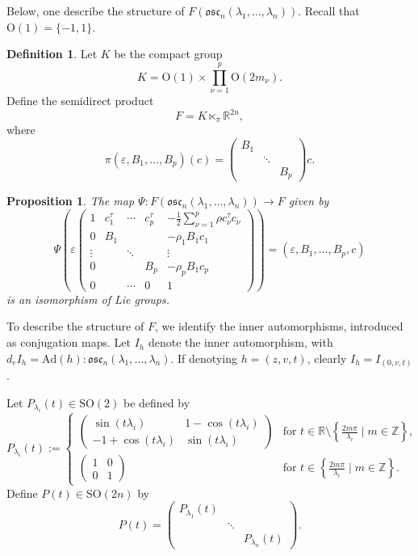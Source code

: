 \documentclass[12pt]{amsart}
\theoremstyle{plain}
\newtheorem{prop}[thm]{Proposition}
\theoremstyle{definition}
\newtheorem{defn}[thm]{Definition}
\theoremstyle{remark}
\begin{document}
Below, one describe the structure of \( F(\mathfrak{osc}_n(\lambda_1, \ldots, \lambda_n)) \). Recall that \( \mathrm{O}(1) = \{-1, 1\} \).
 

\begin{defn}
    Let \( K \) be the compact group
    \[
    K = \mathrm{O}(1) \times \prod_{\nu=1}^p \mathrm{O}(2m_{\nu}).
    \]
    Define the semidirect product
    \[
    F = K \ltimes_{\pi} \mathbb{R}^{2n},
    \]
    where
    \[
    \pi(\varepsilon, B_1, \ldots, B_p)(c) = \left( \begin{matrix}
    B_1  & & \\
     & \ddots & \\
      & & B_p
    \end{matrix} \right) c.
    \]	
\end{defn}

\begin{prop}
    The map \( \Psi: F(\mathfrak{osc}_n(\lambda_1, \ldots, \lambda_n)) \to F \) given by
    \[
    \Psi \left( \varepsilon  \left( 
    \begin{matrix} 
    1 & c_1^{\tau} & \cdots & c_p^{\tau} & -\frac{1}{2} \sum_{\nu=1}^p \rho c_{\nu}^{\tau} c_{\nu} \\
    0 & B_1 & & & -\rho_1 B_1 c_1 \\
    \vdots & & \ddots & & \vdots \\
    0 & & & B_p & -\rho_p B_1 c_p \\
    0 & & \cdots & 0 & 1
    \end{matrix}\right) \right) = (\varepsilon, B_1, \ldots, B_p, c)
    \]
    is an isomorphism of Lie groups.
\end{prop}

To describe the structure of \( F \), we identify the inner automorphisms, introduced as conjugation maps. Let \( I_h \) denote the inner automorphism, with \( d_e I_h = \text{Ad}(h): \mathfrak{osc}_n(\lambda_1, \ldots, \lambda_n) \). If denotying \( h = (z, v, t) \), clearly \( I_h = I_{(0, v, t)} \).

Let \( P_{\lambda_i}(t) \in \mathrm{SO}(2) \) be defined by
\[
P_{\lambda_i}(t) := \left\{
    \begin{array}{cl}
    \left( \begin{matrix}
    \sin(t\lambda_i) & 1 - \cos(t\lambda_i) \\
    -1 + \cos(t\lambda_i) & \sin(t\lambda_i)
    \end{matrix} \right) & \text{for } t \in \mathbb{R} \setminus \left\{\frac{2m\pi}{\lambda_i} \mid m \in \mathbb{Z}\right\}, \\
    \left( \begin{matrix}
    1 & 0 \\
    0 & 1
    \end{matrix} \right) & \text{for } t \in \left\{\frac{2m\pi}{\lambda_i} \mid m \in \mathbb{Z}\right\}.
    \end{array}
\right.
\]
Define \( P(t) \in \mathrm{SO}(2n) \) by
\[
P(t) = \left( \begin{matrix}
P_{\lambda_1}(t) & & \\
& \ddots & \\
& & P_{\lambda_n}(t)
\end{matrix} \right).
\]
\end{document}
